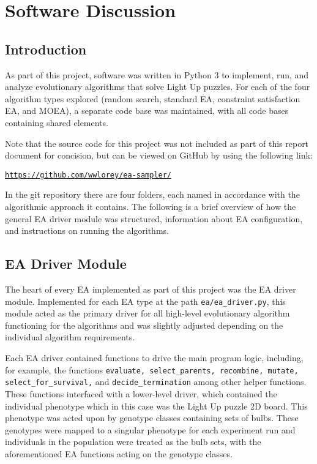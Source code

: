 \documentclass[11pt]{article}
\begin{document}
\section{Software Discussion}

\subsection{Introduction}

As part of this project, software was written in Python 3
to implement, run, and analyze evolutionary algorithms that solve Light Up puzzles. For each
of the four algorithm types explored (random search, standard EA,
constraint satisfaction EA, and MOEA), a separate code base
was maintained, with all code bases containing shared elements.

Note that the source code for this project was not included
as part of this report document for concision, but can be viewed on GitHub by using
the following link: 

\vspace{5mm}

{\centering \texttt{\url{https://github.com/wwlorey/ea-sampler/}}\par }

\vspace{5mm}

In the git repository there are four folders, each named
in accordance with the algorithmic approach it contains.
The following is a brief overview of how the general EA driver module was
structured, information about EA configuration, and instructions on 
running the algorithms.

\subsection{EA Driver Module}

The heart of every EA implemented as part of this project
was the EA driver module. Implemented for each EA type at the
path \texttt{ea/ea\_driver.py}, this module acted as the primary
driver for all high-level evolutionary algorithm functioning for the algorithms and was slightly adjusted
depending on the individual algorithm requirements.

Each EA driver contained functions to drive the main program
logic, including, for example, the functions \texttt{evaluate, 
select\_parents, recombine, mutate, select\_for\_survival,} 
and \texttt{decide\_termination} among other helper functions.
These functions interfaced with a lower-level driver, which
contained the individual phenotype which in this case was 
the Light Up puzzle 2D board. This phenotype was acted upon by
genotype classes containing sets of bulbs. These genotypes were
mapped to a singular phenotype for each experiment run and
individuals in the population were treated as the bulb sets,
with the aforementioned EA functions acting on the genotype classes.
\end{document}

